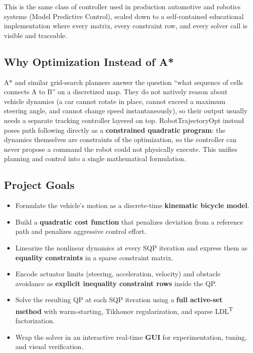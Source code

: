 ﻿\documentclass[11pt,a4paper]{article}
\begin{document}
This is the same class of controller used in production automotive and robotics systems (Model Predictive Control), scaled down to a self-contained educational implementation where every matrix, every constraint row, and every solver call is visible and traceable.

\subsection{Why Optimization Instead of A*}
A* and similar grid-search planners answer the question ``what sequence of cells connects A to B'' on a discretized map. They do not natively reason about vehicle dynamics (a car cannot rotate in place, cannot exceed a maximum steering angle, and cannot change speed instantaneously), so their output usually needs a separate tracking controller layered on top. RobotTrajectoryOpt instead poses path following directly as a \textbf{constrained quadratic program}: the dynamics themselves are constraints of the optimization, so the controller can never propose a command the robot could not physically execute. This unifies planning and control into a single mathematical formulation.

\subsection{Project Goals}
\begin{itemize}[leftmargin=1.2cm]
  \item Formulate the vehicle's motion as a discrete-time \textbf{kinematic bicycle model}.
  \item Build a \textbf{quadratic cost function} that penalizes deviation from a reference path and penalizes aggressive control effort.
  \item Linearize the nonlinear dynamics at every SQP iteration and express them as \textbf{equality constraints} in a sparse constraint matrix.
  \item Encode actuator limits (steering, acceleration, velocity) and obstacle avoidance as \textbf{explicit inequality constraint rows} inside the QP.
  \item Solve the resulting QP at each SQP iteration using a \textbf{full active-set method} with warm-starting, Tikhonov regularization, and sparse LDL\textsuperscript{T} factorization.
  \item Wrap the solver in an interactive real-time \textbf{GUI} for experimentation, tuning, and visual verification.
\end{itemize}
\end{document}

